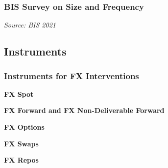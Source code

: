 \documentclass{beamer}
\newenvironment{wideitemize}{\itemize\addtolength{\itemsep}{10pt}}{\enditemize}
\begin{document}
\begin{frame}
  \frametitle{BIS Survey on Size and Frequency}
  \medskip
  \emph{Source: BIS 2021 \href{https://www.bis.org/publ/mc_insights_fxinterventions.pdf}{}}
\end{frame}



\subsection{Instruments}
\begin{frame}
  \frametitle{Instruments for FX Interventions}
  \begin{wideitemize}
    \item \textbf{FX Spot}
    \item \textbf{FX Forward and FX Non-Deliverable Forward}
    \item \textbf{FX Options} 
    \item \textbf{FX Swaps} 
    \item \textbf{FX Repos}
  \end{wideitemize}
\end{frame}
\end{document}
